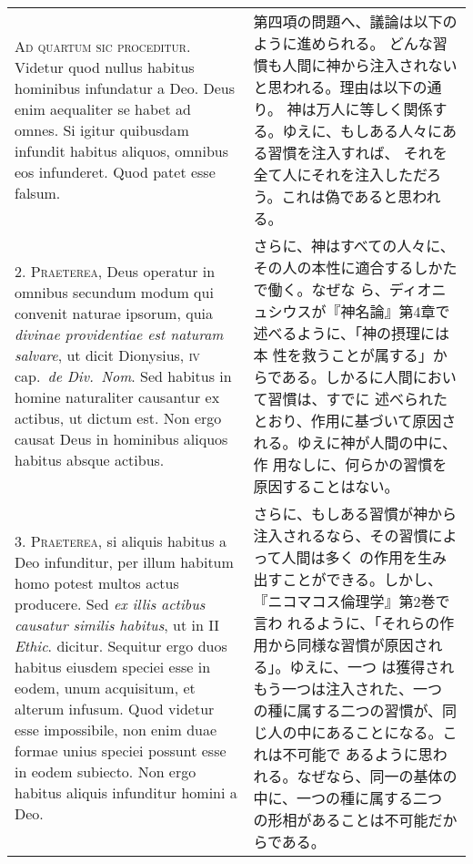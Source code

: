 \documentclass[10pt]{jsarticle} %
\begin{document}
\begin{longtable}{p{21em}p{21em}}

{\scshape Ad quartum sic proceditur}. Videtur quod nullus habitus hominibus
infundatur a Deo. Deus enim aequaliter se habet ad omnes. Si igitur
quibusdam infundit habitus aliquos, omnibus eos infunderet. Quod patet
esse falsum.

&

第四項の問題へ、議論は以下のように進められる。
どんな習慣も人間に神から注入されないと思われる。理由は以下の通り。
神は万人に等しく関係する。ゆえに、もしある人々にある習慣を注入すれば、
それを全て人にそれを注入しただろう。これは偽であると思われる。

\\

2. {\scshape Praeterea}, Deus operatur in omnibus secundum modum qui convenit
naturae ipsorum, quia {\itshape divinae providentiae est naturam salvare}, ut
dicit Dionysius, {\scshape iv} cap.~{\itshape de Div.~Nom}. Sed habitus in homine
naturaliter causantur ex actibus, ut dictum est. Non ergo causat Deus
in hominibus aliquos habitus absque actibus.

&

さらに、神はすべての人々に、その人の本性に適合するしかたで働く。なぜな
 ら、ディオニュシウスが『神名論』第4章で述べるように、「神の摂理には本
 性を救うことが属する」からである。しかるに人間において習慣は、すでに
 述べられたとおり、作用に基づいて原因される。ゆえに神が人間の中に、作
 用なしに、何らかの習慣を原因することはない。

\\



3. {\scshape Praeterea}, si aliquis habitus a Deo infunditur, per
illum habitum homo potest multos actus producere. Sed {\itshape ex
illis actibus causatur similis habitus}, ut in II {\itshape
Ethic}. dicitur. Sequitur ergo duos habitus eiusdem speciei esse in
eodem, unum acquisitum, et alterum infusum. Quod videtur esse
impossibile, non enim duae formae unius speciei possunt esse in eodem
subiecto. Non ergo habitus aliquis infunditur homini a Deo.

&

さらに、もしある習慣が神から注入されるなら、その習慣によって人間は多く
 の作用を生み出すことができる。しかし、『ニコマコス倫理学』第2巻で言わ
 れるように、「それらの作用から同様な習慣が原因される」。ゆえに、一つ
 は獲得されもう一つは注入された、一つ
 の種に属する二つの習慣が、同じ人の中にあることになる。これは不可能で
 あるように思われる。なぜなら、同一の基体の中に、一つの種に属する二つ
 の形相があることは不可能だからである。


\end{longtable}
\end{document}
